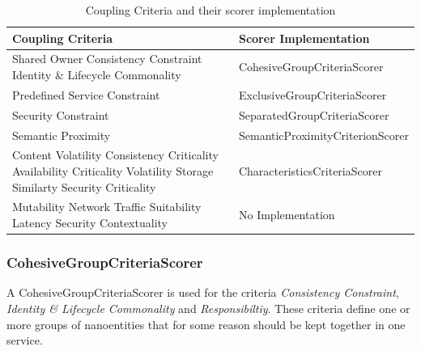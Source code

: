 \begin{table}[H]
	\centering
	\caption{Coupling Criteria and their scorer implementation}
	\label{tab:scorer}
	\begin{tabular}{|p{170pt}|p{200pt}|}
		\hline	
		\textbf{Coupling Criteria} & \textbf{Scorer Implementation}  \\
		\hline
		Shared Owner \newline Consistency Constraint \newline Identity \& Lifecycle Commonality  & CohesiveGroupCriteriaScorer \\
		\hline
		Predefined Service Constraint  & ExclusiveGroupCriteriaScorer \\ 
		\hline
		Security Constraint & SeparatedGroupCriteriaScorer \\
		\hline
		Semantic Proximity & SemanticProximityCriterionScorer \\
		\hline
		Content Volatility \newline Consistency Criticality \newline Availability Criticality \newline Volatility \newline Storage Similarty \newline Security Criticality & CharacteristicsCriteriaScorer  \\
		\hline
		Mutability \newline Network Traffic Suitability \newline Latency \newline Security Contextuality & No Implementation  \\
		\hline
	\end{tabular}
\end{table}





\subsubsection{CohesiveGroupCriteriaScorer}

A CohesiveGroupCriteriaScorer is used for the criteria \textit{Consistency Constraint}, \textit{Identity \& Lifecycle Commonality} and \textit{Responsibiltiy}. These criteria define one or more groups of nanoentities that for some reason should be kept together in one service.


